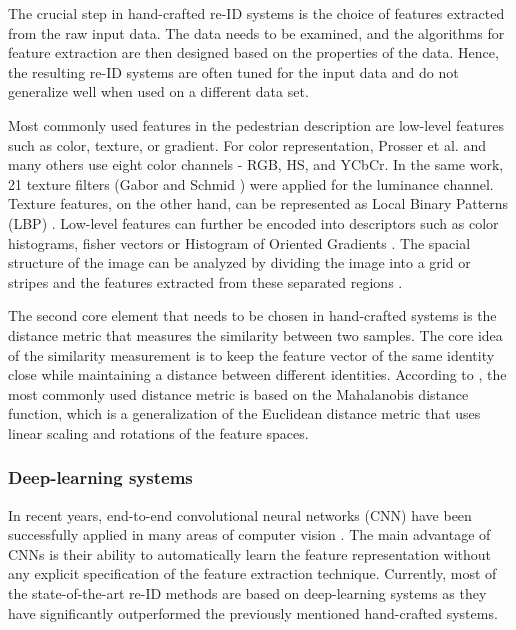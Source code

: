 The crucial step in hand-crafted re-ID systems is the choice of features extracted from the raw input data. The data needs to be examined, and the algorithms for feature extraction are then designed based on the properties of the data. Hence, the resulting re-ID systems are often tuned for the input data and do not generalize well when used on a different data set.

Most commonly used features in the pedestrian description are low-level features such as color, texture, or gradient. For color representation, Prosser et al. \cite{re_id_by_support_vector_ranking} and many others use eight color channels - RGB, HS, and YCbCr. In the same work, 21 texture filters (Gabor \cite{gabor_filters} and Schmid \cite{schmid_filters}) were applied for the luminance channel. Texture features, on the other hand, can be represented as Local Binary Patterns (LBP) \cite{pcca}. Low-level features can further be encoded into descriptors such as color histograms, fisher vectors \cite{fisher_vectors} or Histogram of Oriented Gradients \cite{HOG_human_detection}. The spacial structure of the image can be analyzed by dividing the image into a grid or stripes and the features extracted from these separated regions \cite{pcca}.

The second core element that needs to be chosen in hand-crafted systems is the distance metric that measures the similarity between two samples. The core idea of the similarity measurement is to keep the feature vector of the same identity close while maintaining a distance between different identities. According to \cite{Zheng_past_pres_future}, the most commonly used distance metric is based on the Mahalanobis distance function, which is a generalization of the Euclidean distance metric that uses linear scaling and rotations of the feature spaces. 
\subsubsection{Deep-learning systems}

In recent years, end-to-end convolutional neural networks (CNN) have been successfully applied in many areas of computer vision \cite{DL_for_vison}. The main advantage of CNNs is their ability to automatically learn the feature representation without any explicit specification of the feature extraction technique. Currently, most of the state-of-the-art re-ID methods are based on deep-learning systems as they have significantly outperformed the previously mentioned hand-crafted systems. 

